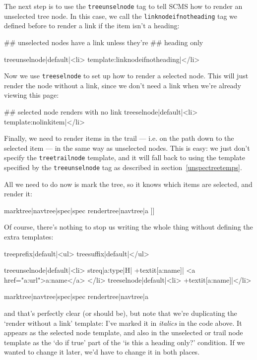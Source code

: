 The next step is to use the \texttt{treeunselnode} tag to tell SCMS how to
render an unselected tree node. In this case, we call the
\texttt{linknodeifnotheading} tag we defined before to render a link if the
item isn't a heading:
\begin{MyVerbatim}
    ## unselected nodes have a link unless they're
    ## heading only
    
    {{treeunselnode|default|<li>
        {{template:linknodeifnotheading}}|</li>}}
\end{MyVerbatim}
Now we use \texttt{treeselnode} to set up how to render a selected node.
This will just render the node without a link, since we don't need a link
when we're already viewing this page:
\begin{MyVerbatim}
    ## selected node renders with no link
    {{treeselnode|default|<li>
            {{template:nolinkitem}}|</li>}}
\end{MyVerbatim}
Finally, we need to render items in the trail --- i.e. on the path
down to the selected item --- in the same way as unselected nodes. This
is easy: we just don't specify the \texttt{treetrailnode} template,
and it will fall back to using the template specified by the \texttt{treeunselnode}
tag as described in section~\ref{unspectreetemps}.

All we need to do now is mark the tree, so it knows which items are selected,
and render it:
\begin{MyVerbatim}
    {{marktree|{{navtree}}|spec|{{spec}}}}
    {{rendertree|{{navtree}}|a}}
]]
\end{MyVerbatim}

Of course, there's nothing to stop us writing the whole thing without defining
the extra templates:
\begin{MyVerbatim}[commandchars=+\[\]]
    {{treeprefix|default|<ul>}}
    {{treesuffix|default|</ul>}}

    {{treeunselnode|default|<li>
        {{streq|{{a:type}}|H|
            +textit[{{a:name}}]|
            <a href="{{a:url}}">{{a:name}}</a>
        </li>}}
    }}
    {{treeselnode|default|<li>
            +textit[{{a:name}}]|</li>}}

    {{marktree|{{navtree}}|spec|{{spec}}}}
    {{rendertree|{{navtree}}|a}}
\end{MyVerbatim}
and that's perfectly clear (or should be), but note that we're duplicating the
`render without a link' template: I've marked it in \textit{italics} in the
code above. It appears as the selected node template, and also in the
unselected or trail node template as the `do if true' part of the `is this a
heading only?' condition. If we wanted to change it later, we'd have to change
it in both places.

